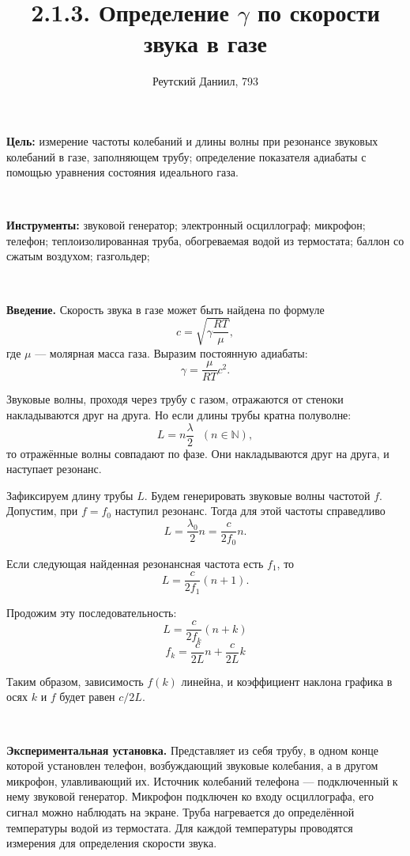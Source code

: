\documentclass[12pt]{article}
\title{2.1.3. Определение $\gamma$ по скорости звука в газе}
\author{Реутский Даниил, 793}
\begin{document}
\maketitle

\textbf{Цель:} измерение частоты колебаний и длины волны при резонансе звуковых колебаний в газе, заполняющем трубу; определение показателя адиабаты с помощью уравнения состояния идеального газа.

~

\textbf{Инструменты:} звуковой генератор; электронный осциллограф; микрофон; телефон; теплоизолированная труба, обогреваемая водой из термостата; баллон со сжатым воздухом; газгольдер;

~

\textbf{Введение.} Скорость звука в газе может быть найдена по формуле
%
$$c = \sqrt{\gamma \frac{RT}{\mu}},$$
%
где $\mu$ --- молярная масса газа. Выразим постоянную адиабаты:
$$\gamma = \frac{\mu}{RT} c^2.$$

Звуковые волны, проходя через трубу с газом, отражаются от стеноки накладываются друг на друга. Но если длины трубы кратна полуволне:
%
$$L = n \frac{\lambda}{2}~~~(n \in \mathbb{N}),$$
%
то отражённые волны совпадают по фазе. Они накладываются друг на друга, и наступает резонанс.

Зафиксируем длину трубы $L$. Будем генерировать звуковые волны частотой $f$. Допустим, при $f = f_0$ наступил резонанс. Тогда для этой частоты справедливо
$$L = \frac{\lambda_0}{2}n = \frac{c}{2f_0}n.$$

Если следующая найденная резонансная частота есть $f_1$, то
$$L = \frac{c}{2f_1}(n + 1).$$

Продожим эту последовательность:
$$L = \frac{c}{2f_k}(n + k)$$
$$f_k = \frac{c}{2L}n + \frac{c}{2L}k$$

Таким образом, зависимость $f(k)$ линейна, и коэффициент наклона графика в осях $k$ и $f$ будет равен $c/2L$.

~

\textbf{Экспериментальная установка.} Представляет из себя трубу, в одном конце которой установлен телефон, возбуждающий звуковые колебания, а в другом  микрофон, улавливающий их. Источник колебаний телефона --- подключенный к нему звуковой генератор. Микрофон подключен ко входу осциллографа, его сигнал можно наблюдать на экране. Труба нагревается до определённой температуры водой из термостата. Для каждой температуры проводятся измерения для определения скорости звука.
\end{document}
